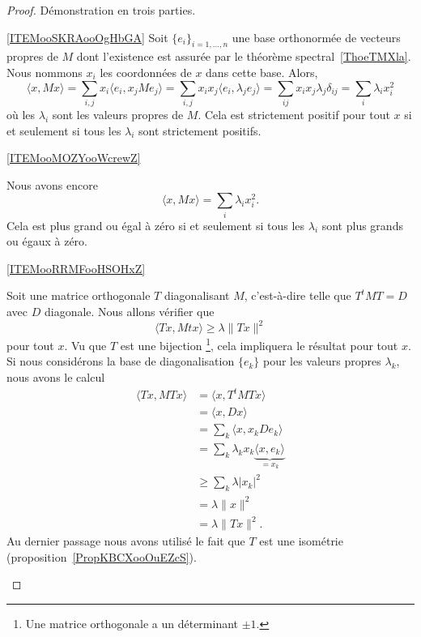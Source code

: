 \begin{proof}
    Démonstration en trois parties.
    \begin{subproof}
    \item[\ref{ITEMooSKRAooOgHbGA}]
    Soit \( \{ e_i \}_{i=1,\ldots, n}\) une base orthonormée de vecteurs propres de \( M\) dont l'existence est assurée par le théorème spectral~\ref{ThoeTMXla}. Nous nommons \( x_i\) les coordonnées de \( x\) dans cette base. Alors,
    \begin{equation}
        \langle x,Mx \rangle =\sum_{i,j}x_i\langle e_i, x_jMe_j\rangle =\sum_{i,j}x_ix_j\langle e_i, \lambda_je_j\rangle =\sum_{ij}x_ix_j\lambda_j\delta_{ij}=\sum_i\lambda_ix_i^2
    \end{equation}
    où les \( \lambda_i\) sont les valeurs propres de \( M\). Cela est strictement positif pour tout \( x\) si et seulement si tous les \( \lambda_i\) sont strictement positifs.
\item[\ref{ITEMooMOZYooWcrewZ}]

    Nous avons encore
    \begin{equation}
        \langle x, Mx\rangle =\sum_{i}\lambda_ix_i^2.
    \end{equation}
    Cela est plus grand ou égal à zéro si et seulement si tous les \( \lambda_i\) sont plus grands ou égaux à zéro.

\item[\ref{ITEMooRRMFooHSOHxZ}]

        Soit une matrice orthogonale \( T\) diagonalisant \( M\), c'est-à-dire telle que \( T^tMT=D\) avec \( D\) diagonale. Nous allons vérifier que
        \begin{equation}
            \langle Tx, Mtx\rangle \geq \lambda\| Tx \|^2
        \end{equation}
        pour tout \( x\). Vu que \( T\) est une bijection \footnote{Une matrice orthogonale a un déterminant $\pm 1$.}, cela impliquera le résultat pour tout \( x\). Si nous considérons la base de diagonalisation \( \{ e_k \}\) pour les valeurs propres \( \lambda_k\), nous avons le calcul
       \begin{subequations}
            \begin{align}
                \langle Tx, MTx\rangle &=\langle x, T^tMTx\rangle \\
                &=\langle x, Dx\rangle \\
                &=\sum_k\langle x, x_kDe_k\rangle \\
                &=\sum_k\lambda_kx_k \underbrace{\langle x, e_k\rangle }_{=x_k}\\
                &\geq \sum_k\lambda| x_k |^2\\
                &=\lambda\| x \|^2\\
                &=\lambda\| Tx \|^2.
            \end{align}
        \end{subequations}
        Au dernier passage nous avons utilisé le fait que \( T\) est une isométrie (proposition~\ref{PropKBCXooOuEZcS}).
    \end{subproof}
\end{proof}

